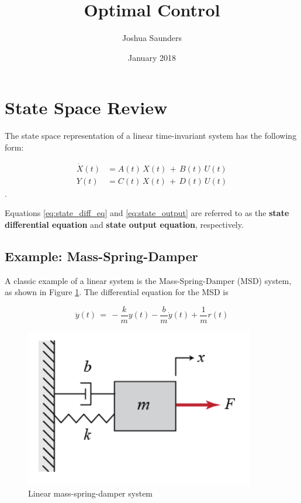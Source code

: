 \documentclass{article}
\title{Optimal Control}
\author{Joshua Saunders}
\date{January 2018}
\begin{document}
\maketitle

\section{State Space Review}

The state space representation of a linear time-invariant system has the 
following form:

\begin{align}     
    \dot{X}(t) &= A(t) \, X(t) \, + \, B(t) \, U(t) \label{eq:state_diff_eq}\\
    Y(t) &= C(t) \, X(t) \, + \, D(t) \, U(t) \label{eq:state_output}
\end{align}.

Equations \ref{eq:state_diff_eq} and \ref{eq:state_output} are referred to as
the \textbf{state differential equation} and \textbf{state output equation},
respectively.

\subsection{Example: Mass-Spring-Damper}

A classic example of a linear system is the Mass-Spring-Damper (MSD) system, as
shown in Figure \ref{fig:mass_spring_damper}. The differential equation for the
MSD is

\begin{equation}
    \ddot{y}(t) \, = \, -\frac{k}{m} y(t) - \frac{b}{m} \dot{y}(t) + \frac{1}{m}r(t) 
\end{equation}
\label{eq:mass_spring_damper}

\begin{figure}[h]
    \begin{center}
        \includegraphics[scale=0.4]{mass_spring_damper}
        \caption{Linear mass-spring-damper system}
        \label{fig:mass_spring_damper}
    \end{center}
\end{figure}
\end{document}
